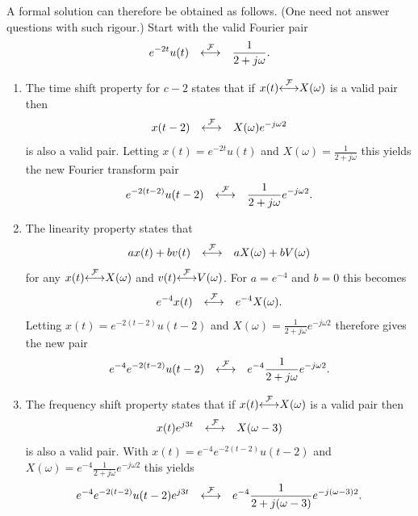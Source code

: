 \documentclass[10pt]{beamer}
\newcommand{\ftpair}{{\stackrel{\cal F}{\longleftrightarrow}}}
\begin{document}
A formal solution can therefore be obtained as follows.  (One need not answer questions with such rigour.)  Start with the valid Fourier pair
\begin{equation*}
  e^{-2t} u(t) \quad \ftpair \quad \frac{1}{2 + j \omega}.
\end{equation*}
\begin{enumerate}

\item The time shift property for $c-2$ states that if $x(t) \ftpair X(\omega)$ is a valid pair then
\begin{equation*}
  x(t-2) \quad \ftpair \quad X(\omega) e^{-j \omega 2}
\end{equation*}
is also a valid pair.  Letting $x(t) = e^{-2t} u(t)$ and $X(\omega) = \frac{1}{2 + j \omega}$ this yields the new Fourier transform pair
\begin{equation*}
  e^{-2(t-2)} u(t-2) \quad \ftpair \quad  \frac{1}{2 + j \omega} e^{-j \omega 2}.
\end{equation*}

\item The linearity property states that
\begin{equation*}
  a x(t) + b v(t) \quad \ftpair \quad a X(\omega) + b V(\omega)
\end{equation*}
for any $x(t) \ftpair X(\omega)$ and $v(t) \ftpair V(\omega)$.  For $a = e^{-4}$ and $b=0$ this becomes
\begin{equation*}
  e^{-4} x(t) \quad \ftpair \quad e^{-4} X(\omega).
\end{equation*}
Letting $x(t) =  e^{-2(t-2)} u(t-2)$ and $X(\omega) = \frac{1}{2 + j \omega} e^{-j \omega 2}$ therefore gives the new pair
\begin{equation*}
   e^{-4} e^{-2(t-2)} u(t-2) \quad \ftpair \quad  e^{-4} \frac{1}{2 + j \omega} e^{-j \omega 2}.
\end{equation*}

\item The frequency shift property states that if $x(t) \ftpair X(\omega)$ is a valid pair then
\begin{equation*}
  x(t) e^{j 3 t} \quad \ftpair \quad X(\omega - 3)
\end{equation*}
is also a valid pair.  With $x(t) =  e^{-4} e^{-2(t-2)} u(t-2)$ and $X(\omega) = e^{-4} \frac{1}{2 + j \omega} e^{-j \omega 2}$ this yields
\begin{equation*}
   e^{-4} e^{-2(t-2)} u(t-2) e^{j 3 t} \quad \ftpair \quad   e^{-4} \frac{1}{2 + j (\omega-3)} e^{-j (\omega-3) 2}.
\end{equation*}

\end{enumerate}
\end{document}
